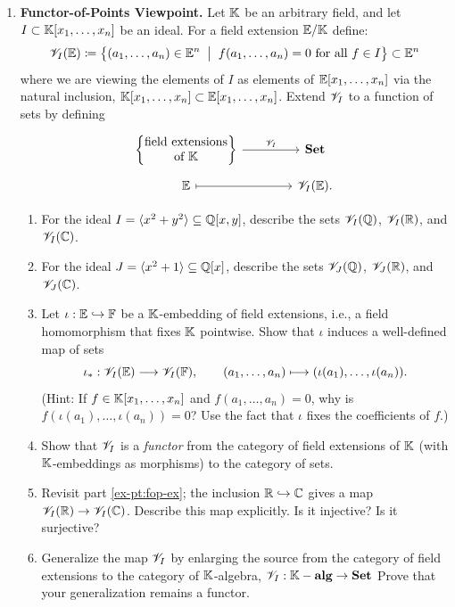 \documentclass[12pt,reqno]{amsart}
\begin{document}
\begin{enumerate}[leftmargin=*]
\item\label{ex:functor-of-points} \textbf{Functor-of-Points Viewpoint.} Let $\mathbb{K}$ be an arbitrary field, and let $I \subset \mathbb{K}[x_1,\ldots,x_n]$ be an ideal. For a field extension $\mathbb{E}/\mathbb{K}$ define:
\[
\mathcal{V}_{I}(\mathbb{E}) \coloneqq\left\{ (a_1,\ldots,a_n) \in\mathbb{E}^n \;\; \big| \;\; \text{$f(a_1,\ldots,a_n) = 0$ for all $f\in I$}\right\} \subset \mathbb{E}^n
\]
where we are viewing the elements of $I$ as elements of $\mathbb{E}[x_1,\ldots,x_n]$ via the natural inclusion, $\mathbb{K}[x_1,\ldots,x_n] \subset \mathbb{E}[x_1,\ldots,x_n]$. Extend $\mathcal{V}_{I}$ to a function of sets by defining
\[
\begin{tikzcd}[row sep = .5em, column sep = 4em]
\left\{ \begin{matrix} \text{field extensions} \\ \text{of $\KK$} \end{matrix} \right\} \arrow[r, "\cV_{I}"] & \Set \\
\EE \arrow[r, mapsto] & \cV_{I}(\EE).
\end{tikzcd}
\]
\begin{enumerate}[label=(\alph*),ref=\theenumi\alph*]
\item\label{ex-pt:fop-ex} For the ideal $I=\langle x^2+y^2\rangle \subseteq \mathbb{Q}[x,y]$, describe the sets $\mathcal{V}_I(\mathbb{Q})$, $\mathcal{V}_I(\mathbb{R})$, and $\mathcal{V}_I(\mathbb{C})$.
\item For the ideal $J=\langle x^2+1\rangle \subseteq \mathbb{Q}[x]$, describe the sets $\mathcal{V}_J(\mathbb{Q})$, $\mathcal{V}_J(\mathbb{R})$, and $\mathcal{V}_J(\mathbb{C})$.
\item Let $\iota:\mathbb{E}\hookrightarrow \mathbb{F}$ be a $\mathbb{K}$-embedding of field extensions, i.e., a field homomorphism that fixes $\mathbb{K}$ pointwise. Show that $\iota$ induces a well-defined map of sets
\[
\iota_*:\mathcal{V}_I(\mathbb{E})\longrightarrow \mathcal{V}_I(\mathbb{F}),\qquad (a_1,\ldots,a_n)\longmapsto (\iota(a_1),\ldots,\iota(a_n)).
\]
(Hint: If $f\in \mathbb{K}[x_1,\ldots,x_n]$ and $f(a_1,\ldots,a_n)=0$, why is $f(\iota(a_1),\ldots,\iota(a_n))=0$? Use the fact that $\iota$ fixes the coefficients of $f$.)
\item Show that $\mathcal{V}_I$ is a \emph{functor} from the category of field extensions of $\mathbb{K}$ (with $\mathbb{K}$-embeddings as morphisms) to the category of sets.
\item Revisit part \ref{ex-pt:fop-ex}; the inclusion $\mathbb{R}\hookrightarrow \mathbb{C}$ gives a map $\mathcal{V}_I(\mathbb{R})\to \mathcal{V}_I(\mathbb{C})$. Describe this map explicitly. Is it injective? Is it surjective?
\item Generalize the map $\mathcal{V}_I$ by enlarging the source from the category of field extensions to the category of $\mathbb{K}$-algebra, $\mathcal{V}_{I}: \mathbb{K}-\operatorname{\textbf{alg}} \to \operatorname{\textbf{Set}}$ Prove that your generalization remains a functor.  
\end{enumerate}
\end{enumerate}
\end{document}
